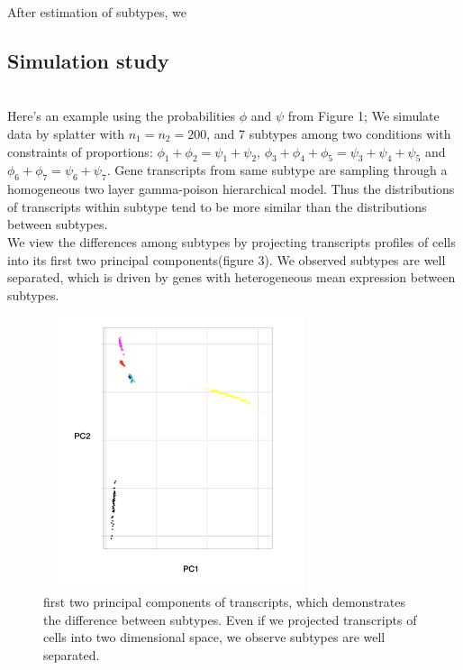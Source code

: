 \documentclass[11pt]{amsart}
\begin{document}
After estimation of subtypes, we 

\subsection{Simulation study}\hfill\\
Here's an example using the probabilities $\phi$ and $\psi$ from Figure 1;
We simulate data by splatter\cite{ref:Zappia} with $n_1=n_2=200$, and 7 subtypes among two conditions with constraints of proportions: $\phi_1 + \phi_2 = \psi_1 + \psi_2$, $\phi_3 + \phi_4 +\phi_5 = \psi_3 + \psi_4 + \psi_5$ and $\phi_6 + \phi_7 = \psi_6 + \psi_7$. Gene transcripts from same subtype are sampling through a homogeneous two layer gamma-poison hierarchical model. Thus the distributions of transcripts within subtype tend to be more similar than the distributions between subtypes. \\
We view the differences among subtypes by projecting transcripts profiles of cells into its first two principal components(figure 3). We observed subtypes are well separated, which is driven by genes with heterogeneous mean expression between subtypes.
\begin{figure}[h!]
  \includegraphics[height=8cm, width=8cm]{pca.png}
  \caption{first two principal components of transcripts, which demonstrates the difference between subtypes. Even if we projected transcripts of cells into two dimensional space, we observe subtypes are well separated.}
  \label{fig:4}
\end{figure}
\end{document}
